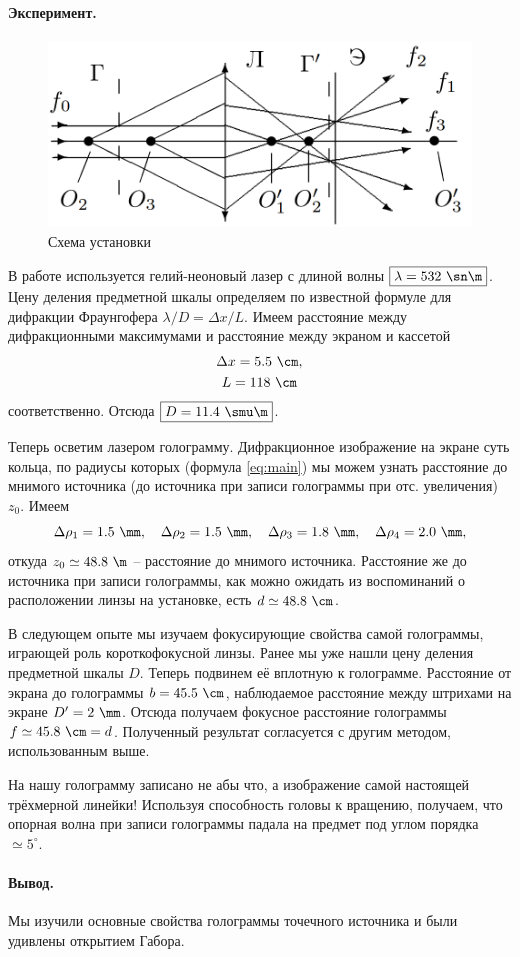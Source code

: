 \documentclass{../lab_class}
\begin{document}
\paragraph{Эксперимент.}

\begin{figure}[H]
\centering
\includegraphics[width = 0.4 \textwidth]{sch01.png}
\caption{Схема установки}
	\label{fig:scheme}
\end{figure}

В работе используется гелий-неоновый лазер с длиной волны $\boxed{\lambda = 532 \ \sn \m}$. Цену деления предметной шкалы определяем по известной формуле для дифракции Фраунгофера $\lambda/D = \Delta x / L$. Имеем расстояние между дифракционными максимумами и расстояние между экраном и кассетой
\begin{gather*}
	\Delta x = 5.5 \ \cm, \\
	L = 118 \ \cm
\end{gather*}
соответственно. Отсюда $\boxed{D = 11.4 \ \smu \m}$.

Теперь осветим лазером голограмму. Дифракционное изображение на экране суть кольца, по радиусы которых (формула \ref{eq:main}) мы можем узнать расстояние до мнимого источника (до источника при записи голограммы при отс. увеличения) $z_0$. Имеем
\begin{equation*}
	\Delta\rho_1 = 1.5 \ \mm, \quad \Delta\rho_2 = 1.5 \ \mm, \quad \Delta\rho_3 = 1.8 \ \mm, \quad \Delta\rho_4 = 2.0 \ \mm,
\end{equation*}
откуда $z_0 \simeq 48.8 \ \m$ -- расстояние до мнимого источника. Расстояние же до источника при записи голограммы, как можно ожидать из воспоминаний о расположении линзы на установке, есть $d \simeq 48.8 \ \cm$.

В следующем опыте мы изучаем фокусирующие свойства самой голограммы, играющей роль короткофокусной линзы. Ранее мы уже нашли цену деления предметной шкалы $D$. Теперь подвинем её вплотную к голограмме. Расстояние от экрана до голограммы $b = 45.5 \ \cm$, наблюдаемое расстояние между штрихами на экране $D' = 2 \ \mm$. Отсюда получаем фокусное расстояние голограммы $f \simeq 45.8 \ \cm = d$. Полученный результат согласуется с другим методом, использованным выше. 

На нашу голограмму записано не абы что, а изображение самой настоящей трёхмерной линейки! Используя способность головы к вращению, получаем, что опорная волна при записи голограммы падала на предмет под углом порядка $\simeq 5^{\circ}$.

\paragraph{Вывод.}
Мы изучили основные свойства голограммы точечного источника и были удивлены открытием Габора. 
\end{document}

